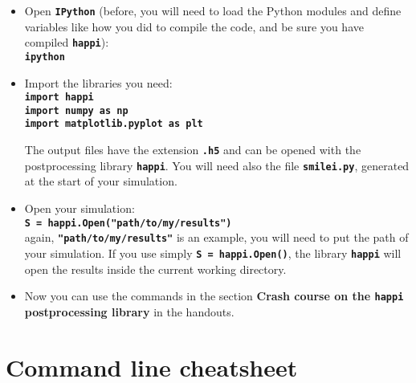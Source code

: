 \documentclass{article}
\newcommand{\commandline}[1]{\texttt{\textbf{#1}}}
\begin{document}
\begin{itemize}
\item Open \commandline{IPython} (before, you will need to load the Python modules and define variables like how you did to compile the code, and be sure you have compiled \commandline{happi}):\\
\commandline{ipython}

\item Import the libraries you need:\\
\commandline{import happi}\\
\commandline{import numpy as np}\\
\commandline{import matplotlib.pyplot as plt}

The output files have the extension \commandline{.h5} and can be opened with the postprocessing library \commandline{happi}. You will need also the file \commandline{smilei.py}, generated at the start of your simulation.

\item Open your simulation:\\
\commandline{S = happi.Open("path/to/my/results")}\\
again, \commandline{"path/to/my/results"} is an example, you will need to put the path of your simulation. If you use simply \commandline{S = happi.Open()}, the library \commandline{happi} will open the results inside the current working directory.

\item Now you can use the commands in the section \textbf{Crash course on the \commandline{happi} postprocessing library} in the handouts.

\end{itemize}


\section{Command line cheatsheet}
\end{document}
